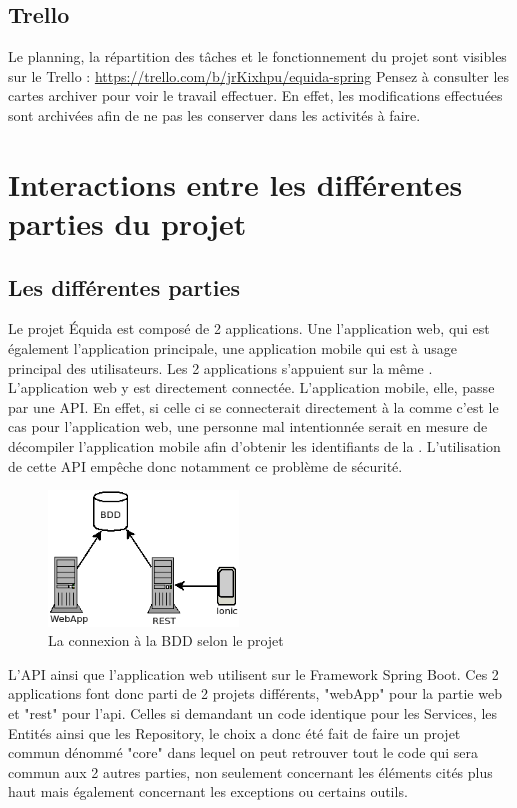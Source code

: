 		\subsection{Trello}
			Le planning, la répartition des tâches et le fonctionnement du projet sont visibles sur le Trello : \url{https://trello.com/b/jrKixhpu/equida-spring}
			Pensez à consulter les cartes archiver pour voir le travail effectuer. En effet, les modifications effectuées sont archivées afin de ne pas les conserver dans les activités à faire.

	\section{Interactions entre les différentes parties du projet}
		\subsection{Les différentes parties}
			Le projet Équida est composé de 2 applications. Une l'application web, qui est également l'application principale, une application mobile qui est à usage principal des utilisateurs. Les 2 applications s'appuient sur la même \bdd{}. L'application web y est directement connectée. L'application mobile, elle, passe par une API. En effet, si celle ci se connecterait directement à la \bdd{} comme c'est le cas pour l'application web, une personne mal intentionnée serait en mesure de décompiler l'application mobile afin d'obtenir les identifiants de la \bdd{}. L'utilisation de cette API empêche donc notamment ce problème de sécurité.

			\begin{figure}[H]
				\centering\includegraphics[width=0.45\textwidth, keepaspectratio]{res/diag_infra.png}
				\caption{La connexion à la BDD selon le projet}
			\end{figure}

			L'API ainsi que l'application web utilisent sur le Framework Spring Boot. Ces 2 applications font donc parti de 2 projets différents, "webApp" pour la partie web et "rest" pour l'api. Celles si demandant un code identique pour les Services, les Entités ainsi que les Repository, le choix a donc été fait de faire un projet commun dénommé "core" dans lequel on peut retrouver tout le code qui sera commun aux 2 autres parties, non seulement concernant les éléments cités plus haut mais également concernant les exceptions ou certains outils.

